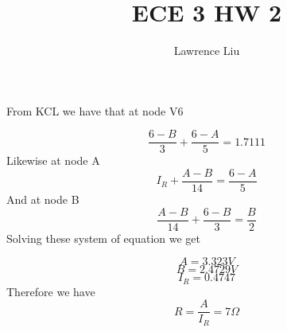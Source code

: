 \documentclass[12pt]{article}
\title{ECE 3 HW 2}
\author{Lawrence Liu}
\begin{document}
\maketitle

From KCL we have that at node V6

$$\frac{6-B}{3}+\frac{6-A}{5}=1.7111$$
Likewise at node A
$$I_R+\frac{A-B}{14}=\frac{6-A}{5}$$
And at node B
$$\frac{A-B}{14}+\frac{6-
B}{3}=\frac{B}{2}$$
Solving these system of equation we get

$$A=3.323V$$
$$B=2.4729V$$
$$I_R=0.4747$$
Therefore we have
$$R=\frac{A}{I_R}=\boxed{7\Omega}$$
\end{document}
